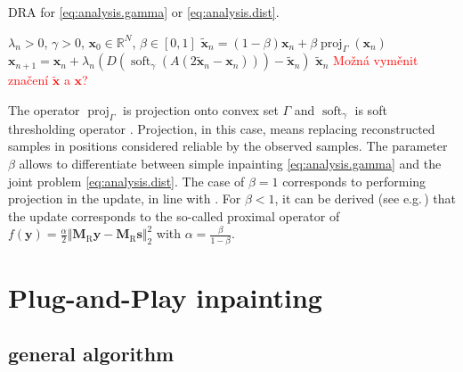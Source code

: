 \documentclass[conference]{IEEEtran}
\newcommand{\todo}[1]{\textcolor{red}{#1}}
\begin{document}
\begin{algorithm}
	\caption{DRA for \eqref{eq:analysis.gamma} or \eqref{eq:analysis.dist}.}
	\begin{algorithmic}[1]\label{alg:DRA}
		\renewcommand{\algorithmicrequire}{\textbf{Input:}}
		\renewcommand{\algorithmicensure}{\textbf{Output:}}
		\REQUIRE $ \lambda_n > 0 $, $ \gamma>0 $, $ \mathbf{x}_0 \in \mathbb{R}^{N} $, $\beta \in [0, 1]$
		\STATE $\mathbf{\widetilde{x}}_n= (1-\beta)\mathbf{x}_n + \beta \operatorname{proj}_{\Gamma}(\mathbf{x}_n) $ 
		\STATE $ \mathbf{x}_{n+1} = \mathbf{x}_n + \lambda_n \left( D\left(\operatorname{soft}_{\gamma}\left(A\left(2\mathbf{\widetilde{x}}_n-\mathbf{x}_n\right) \right)\right) -\mathbf{\widetilde{x}}_n\right)$
		\ENDFOR
		\RETURN $\mathbf{\widetilde{x}}_n$ \todo{Možná vyměnit značení $\mathbf{\widetilde{x}}$ a $\mathbf{x}$?}
	\end{algorithmic} 
\end{algorithm}

The operator $ \operatorname{proj}_{\Gamma}$ is projection onto convex set $ \Gamma $ and $\operatorname{soft}_{\gamma}$ is soft thresholding operator \cite{Combettes2011}.
Projection, in this case, means replacing reconstructed samples in positions considered reliable by the observed samples.
The parameter $\beta$ allows to differentiate between simple inpainting \eqref{eq:analysis.gamma} and the joint problem \eqref{eq:analysis.dist}.
The case of $\beta = 1$ corresponds to performing projection in the update, in line with \cite{Mokry2020}.
For $\beta < 1$, it can be derived (see e.g.\,\cite[Sec.\,4 and Tab.\,1]{Combettes2011}) that the update corresponds to the so-called proximal operator of $f(\mathbf{y}) = \frac{\alpha}{2} \Vert \mathbf{M}_{\mathrm{R}} \mathbf {y} - \mathbf{M}_{\mathrm{R}} \mathbf{s} \Vert^2_2$ with $\alpha = \frac{\beta}{1-\beta}$.


\section{Plug-and-Play inpainting} \label{sec:plugaandplay}

\subsection{general algorithm}
\end{document}
